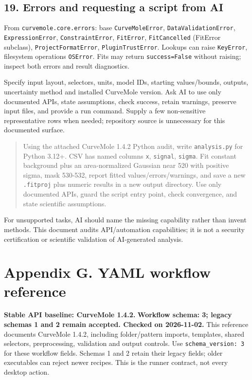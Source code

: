 \documentclass[
  10pt,
  a4paper,
  oneside]{scrreprt}
\begin{document}
\hypertarget{errors-and-requesting-a-script-from-ai}{%
\section{19. Errors and requesting a script from
AI}\label{errors-and-requesting-a-script-from-ai}}

From \texttt{curvemole.core.errors}: base \texttt{CurveMoleError},
\texttt{DataValidationError}, \texttt{ExpressionError},
\texttt{ConstraintError}, \texttt{FitError}, \texttt{FitCancelled}
(FitError subclass), \texttt{ProjectFormatError},
\texttt{PluginTrustError}. Lookups can raise \texttt{KeyError},
filesystem operations \texttt{OSError}. Fits may return
\texttt{success=False} without raising; inspect both errors and result
diagnostics.

Specify input layout, selectors, units, model IDs, starting
values/bounds, outputs, uncertainty method and installed CurveMole
version. Ask AI to use only documented APIs, state assumptions, check
success, retain warnings, preserve input files, and provide a run
command. Supply a few non-sensitive representative rows when needed;
repository source is unnecessary for this documented surface.

\begin{quote}
Using the attached CurveMole 1.4.2 Python audit, write
\texttt{analysis.py} for Python 3.12+. CSV has named columns \texttt{x},
\texttt{signal}, \texttt{sigma}. Fit constant background plus an
area-normalized Gaussian near 520 with positive sigma, mask 530-532,
report fitted values/errors/warnings, and save a new \texttt{.fitproj}
plus numeric results in a new output directory. Use only documented
APIs, guard the script entry point, check convergence, and state
scientific assumptions.
\end{quote}

For unsupported tasks, AI should name the missing capability rather than
invent methods. This document audits API/automation capabilities; it is
not a security certification or scientific validation of AI-generated
analysis.

\hypertarget{appendix-g.-yaml-workflow-reference}{%
\chapter{Appendix G. YAML workflow
reference}\label{appendix-g.-yaml-workflow-reference}}

\textbf{Stable API baseline: CurveMole 1.4.2.} \textbf{Workflow schema:
3; legacy schemas 1 and 2 remain accepted. Checked on 2026-11-02.} This
reference documents CurveMole 1.4.2, including folder/pattern imports,
templates, shared selectors, preprocessing, validation and output
controls. Use \texttt{schema\_version:\ 3} for these workflow fields.
Schemas 1 and 2 retain their legacy fields; older executables can reject
newer recipes. This is the runner contract, not every desktop action.
\end{document}
